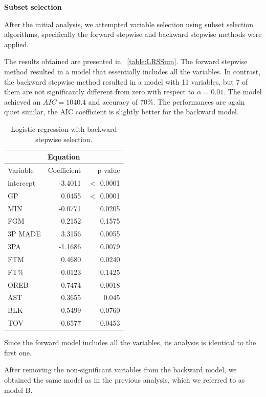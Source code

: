 \vspace{0.2cm}
\textbf{Subset selection}

After the initial analysis, we attempted variable selection using subset selection algorithms, specifically the forward stepwise and backward stepwise methods were applied. 

The results obtained are presented in \Tab~\ref{table:LRSSum}. The forward stepwise method resulted in a model that essentially includes all the variables. In contrast, the backward stepwise method resulted in a model with 11 variables, but 7 of them are not significantly different from zero with respect to $\alpha = 0.01$. The model achieved an $AIC = 1040.4$ and accuracy of $70\%$. The performances are again quiet similar, the AIC coefficient is slightly better for the backward model.

\begin{table}[H]
	\centering
	\begin{tabular}{|| l | r | r ||} 
		\hline
		\multicolumn{3}{|c|}{Equation} \\
		\hline
		Variable & Coefficient & p-value \\
		\hline
		intercept & -3.4011 & $<$ 0.0001 \\
		GP & 0.0455 & $<$ 0.0001 \\
		MIN & -0.0771 & 0.0205 \\
		FGM & 0.2152 & 0.1575 \\
		3P MADE & 3.3156 & 0.0055 \\
		3PA & -1.1686 & 0.0079 \\
		FTM & 0.4680 & 0.0240 \\
		FT\% & 0.0123 & 0.1425 \\
		OREB & 0.7474 & 0.0018 \\
		AST & 0.3655 & 0.045 \\
		BLK & 0.5499 & 0.0760 \\				
		TOV & -0.6577 & 0.0453 \\
		\hline
	\end{tabular}
	\caption{Logistic regression with backward stepwise selection.}
	\label{table:LRBSSum}
\end{table}

Since the forward model includes all the variables, its analysis is identical to the first one.

After removing the non-significant variables from the backward model, we obtained the same model as in the previous analysis, which we referred to as model B. 


